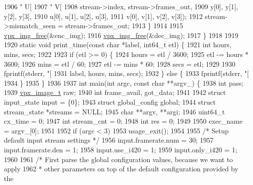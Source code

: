 \begin{DoxyCodeInclude}
{{{{{{{{{{{{{{{{{{{{{{{{{{{{{{{{{{{{{{{{{{{{{{{{{{{{{{{{1906                           \textcolor{stringliteral}{" U[%
1907                           \textcolor{stringliteral}{" V[%
1908                           stream->index, stream->frames\_out,
1909                           y[0], y[1], y[2], y[3],
1910                           u[0], u[1], u[2], u[3],
1911                           v[0], v[1], v[2], v[3]);
1912     stream->mismatch\_seen = stream->frames\_out;
1913   \}
1914 
1915   \hyperlink{vpx__image_8h_af47ebaf286812d037425d41990d48a17}{vpx\_img\_free}(&enc\_img);
1916   \hyperlink{vpx__image_8h_af47ebaf286812d037425d41990d48a17}{vpx\_img\_free}(&dec\_img);
1917 \}
1918 
1919 
1920 \textcolor{keyword}{static} \textcolor{keywordtype}{void} print\_time(\textcolor{keyword}{const} \textcolor{keywordtype}{char} *label, int64\_t etl) \{
1921   \textcolor{keywordtype}{int} hours, mins, secs;
1922 
1923   \textcolor{keywordflow}{if} (etl >= 0) \{
1924     hours = etl / 3600;
1925     etl -= hours * 3600;
1926     mins = etl / 60;
1927     etl -= mins * 60;
1928     secs = etl;
1929 
1930     fprintf(stderr, \textcolor{stringliteral}{"[%
1931             label, hours, mins, secs);
1932   \} \textcolor{keywordflow}{else} \{
1933     fprintf(stderr, \textcolor{stringliteral}{"[%
1934   \}
1935 \}
1936 
1937 \textcolor{keywordtype}{int} main(\textcolor{keywordtype}{int} argc, \textcolor{keyword}{const} \textcolor{keywordtype}{char} **argv\_) \{
1938   \textcolor{keywordtype}{int}                    pass;
1939   \hyperlink{structvpx__image}{vpx\_image\_t}            raw;
1940   \textcolor{keywordtype}{int}                    frame\_avail, got\_data;
1941 
1942   \textcolor{keyword}{struct }input\_state       input = \{0\};
1943   \textcolor{keyword}{struct }global\_config     global;
1944   \textcolor{keyword}{struct }stream\_state     *streams = NULL;
1945   \textcolor{keywordtype}{char}                   **argv, **argi;
1946   uint64\_t                 cx\_time = 0;
1947   \textcolor{keywordtype}{int}                      stream\_cnt = 0;
1948   \textcolor{keywordtype}{int}                      res = 0;
1949 
1950   exec\_name = argv\_[0];
1951 
1952   \textcolor{keywordflow}{if} (argc < 3)
1953     usage\_exit();
1954 
1955   \textcolor{comment}{/* Setup default input stream settings */}
1956   input.framerate.num = 30;
1957   input.framerate.den = 1;
1958   input.use\_i420 = 1;
1959   input.only\_i420 = 1;
1960 
1961   \textcolor{comment}{/* First parse the global configuration values, because we want to apply}
1962 \textcolor{comment}{   * other parameters on top of the default configuration provided by the}
}}}}}}}}}}}}}}}}}}}}}}}}}}}}}}}}}}}}}}}}}}}}}}}}}}}}}}}}}}}}
\end{DoxyCodeInclude}
